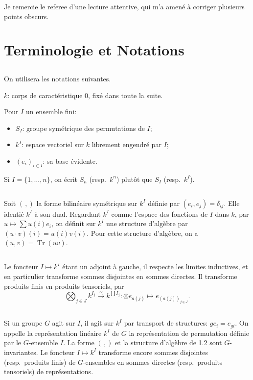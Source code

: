 \documentclass[11pt,a4paper]{article}
\theoremstyle{plain}
\theoremstyle{definition}
\DeclareMathOperator{\Tr}{Tr}
\newcommand{\isom}{\xrightarrow{\sim}}
\begin{document}
Je remercie le referee d'une lecture attentive, qui m'a amen\'e \`a corriger plusieurs points obscurs.


\section{Terminologie et Notations}

\subsection{}
On utilisera les notations suivantes.

$k$: corps de caract\'eristique $0$, fix\'e dans toute la suite.

Pour $I$ un ensemble fini:
\begin{itemize}[label={},leftmargin=*]
\item $S_I$: groupe sym\'etrique des permutations de $I$;
\item $k^I$: espace vectoriel sur $k$ librement engendr\'e par $I$;
\item $(e_i)_{i \in I}$: sa base \'evidente.
\end{itemize}
Si $I = \{1, \ldots, n\}$, on \'ecrit $S_n$ (resp.~$k^n$) plut\^ot que $S_I$ (resp.~$k^I$).

\subsection{}
Soit $(\,,)$ la forme bilin\'eaire sym\'etrique sur $k^I$ d\'efinie par $(e_i, e_j) = \delta_{ij}$. Elle identi\'e $k^I$ \`a son dual. Regardant $k^I$ comme l'espace des fonctions de $I$ dans $k$, par $u \mapsto \sum u(i) e_i$, on d\'efinit sur $k^I$ une structure d'alg\`ebre par $(u \cdot v)(i) = u(i) v(i)$. Pour cette structure d'alg\`ebre, on a $(u, v) = \Tr(uv)$.

\subsection{}
Le foncteur $I \mapsto k^I$ \'etant un adjoint \`a gauche, il respecte les limites inductives, et en particulier transforme sommes disjointes en sommes directes. Il transforme produits finis en produits tensoriels, par
\[
\bigotimes_{j \in J} k^{I_j} \isom k^{\prod I_j} : \otimes e_{a(j)} \longmapsto e_{(a(j))_{j \in J}}.
\]

\subsection{}
Si un groupe $G$ agit sur $I$, il agit sur $k^I$ par transport de structures: $ge_i = e_{gi}$. On appelle la repr\'esentation lin\'eaire $k^I$ de $G$ la repr\'esentation de permutation d\'efinie par le $G$-ensemble $I$. La forme $(\,,)$ et la structure d'alg\`ebre de 1.2 sont $G$-invariantes. Le foncteur $I \mapsto k^I$ transforme encore sommes disjointes (resp.~produits finis) de $G$-ensembles en sommes directes (resp.~produits tensoriels) de repr\'esentations.
\end{document}
